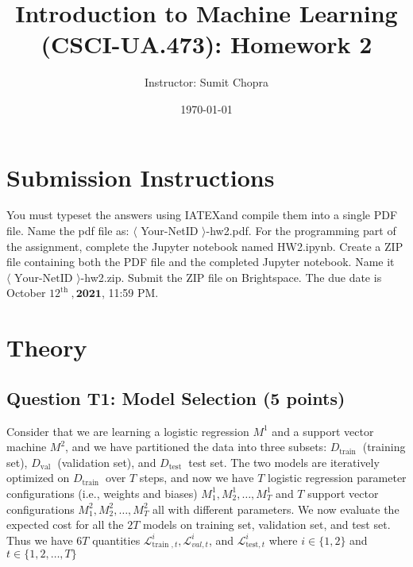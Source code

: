 \documentclass[10pt]{article}
\title{Introduction to Machine Learning (CSCI-UA.473): Homework 2 }
\author{Instructor: Sumit Chopra}
\date{\today}
\begin{document}
\maketitle

\section*{Submission Instructions}
You must typeset the answers using IATEXand compile them into a single PDF file. Name the pdf file as: $\langle$ Your-NetID $\rangle$-hw2.pdf. For the programming part of the assignment, complete the Jupyter notebook named HW2.ipynb. Create a ZIP file containing both the PDF file and the completed Jupyter notebook. Name it $\langle \text{ Your-NetID }\rangle$-hw2.zip. Submit the ZIP file on Brightspace. The due date is October $12^{\text {th }}, \mathbf{2 0 2 1}$, 11:59 PM.

\section*{Theory}
\subsection*{Question T1: Model Selection (5 points)}
Consider that we are learning a logistic regression $M^{1}$ and a support vector machine $M^{2}$, and we have partitioned the data into three subsets: $D_{\text {train }}$ (training set), $D_{\text {val }}$ (validation set), and $D_{\text {test }}$ test set. The two models are iteratively optimized on $D_{\text {train }}$ over $T$ steps, and now we have $T$ logistic regression parameter configurations (i.e., weights and biases) $M_{1}^{1}, M_{2}^{1}, \ldots, M_{T}^{1}$ and $T$ support vector configurations $M_{1}^{2}, M_{2}^{2}, \ldots, M_{T}^{2}$ all with different parameters. We now evaluate the expected cost for all the $2 T$ models on training set, validation set, and test set. Thus we have $6 T$ quantities $\mathcal{L}_{\text {train }, t}^{i}, \mathcal{L}_{v a l, t}^{i}$, and $\mathcal{L}_{\text {test}, t}^{i}$ where $i \in\{1,2\}$ and $t \in\{1,2, \ldots, T\}$
\end{document}
